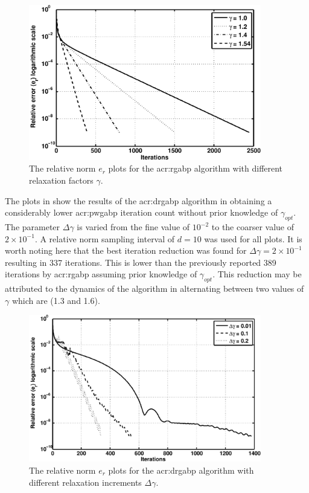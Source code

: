 \begin{figure}[h]
	\centering
	\includegraphics[width=4in]{err_plot_1}
	\caption[Performance of the \acrshort{acr:rgabp} for different relaxation factors.]{The relative norm $e_r$ plots for the \gls{acr:rgabp} algorithm with different relaxation factors $\gamma$.}
	\label{fig:err_rlx}
\end{figure}

The plots in  show the results of the \gls{acr:drgabp} algorithm in obtaining a considerably lower \gls{acr:pwgabp} iteration count without prior knowledge of $\gamma_{opt}$.
The parameter $\Delta\gamma$ is varied from the fine value of $10^{-2}$ to the coarser value of $2\times 10^{-1}$.
A relative norm sampling interval of $d = 10$ was used for all plots.
It is worth noting here that the best iteration reduction was found for $\Delta\gamma = 2\times 10^{-1}$ resulting in 337 iterations.
This is lower than the previously reported 389 iterations by \gls{acr:rgabp} assuming prior knowledge of $\gamma_{opt}$.
This reduction may be attributed to the dynamics of the algorithm in alternating between two values of $\gamma$ which are (1.3 and 1.6). 

\begin{figure}[h]
	\centering
	\includegraphics[width=4in]{err_plot_2}
	\caption[Performance of \acrshort{acr:drgabp} for different relaxation increments.]{The relative norm $e_r$ plots for the \gls{acr:drgabp} algorithm with different relaxation increments $\Delta\gamma$.}
	\label{fig:err_IncRlx}
\end{figure}

